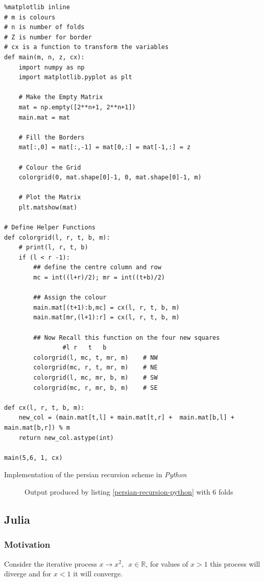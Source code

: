 \documentclass[11pt]{article}
\begin{document}
\begin{listing}[htbp]
\begin{verbatim}
%matplotlib inline
# m is colours
# n is number of folds
# Z is number for border
# cx is a function to transform the variables
def main(m, n, z, cx):
    import numpy as np
    import matplotlib.pyplot as plt

    # Make the Empty Matrix
    mat = np.empty([2**n+1, 2**n+1])
    main.mat = mat

    # Fill the Borders
    mat[:,0] = mat[:,-1] = mat[0,:] = mat[-1,:] = z

    # Colour the Grid
    colorgrid(0, mat.shape[0]-1, 0, mat.shape[0]-1, m)

    # Plot the Matrix
    plt.matshow(mat)

# Define Helper Functions
def colorgrid(l, r, t, b, m):
    # print(l, r, t, b)
    if (l < r -1):
        ## define the centre column and row
        mc = int((l+r)/2); mr = int((t+b)/2)

        ## Assign the colour
        main.mat[(t+1):b,mc] = cx(l, r, t, b, m)
        main.mat[mr,(l+1):r] = cx(l, r, t, b, m)

        ## Now Recall this function on the four new squares
                #l r   t   b
        colorgrid(l, mc, t, mr, m)    # NW
        colorgrid(mc, r, t, mr, m)    # NE
        colorgrid(l, mc, mr, b, m)    # SW
        colorgrid(mc, r, mr, b, m)    # SE

def cx(l, r, t, b, m):
    new_col = (main.mat[t,l] + main.mat[t,r] +  main.mat[b,l] + main.mat[b,r]) % m
    return new_col.astype(int)

main(5,6, 1, cx)
\end{verbatim}
\caption{\label{persian-recursion-python}Implementation of the persian recursion scheme in \emph{Python}}
\end{listing}



\begin{figure}[htbp]
\centering

\caption{\label{6-rug}Output produced by listing \ref{persian-recursion-python} with 6 folds}
\end{figure}

\subsection{Julia}
\label{sec:org45f0e51}
\subsubsection{Motivation}
\label{sec:org50fa299}
Consider the iterative process \(x \rightarrow x^{2}, \enspace x \in \mathbb{R}\),
for values of \(x>1\) this process will diverge and for \(x<1\) it will converge.
\end{document}
